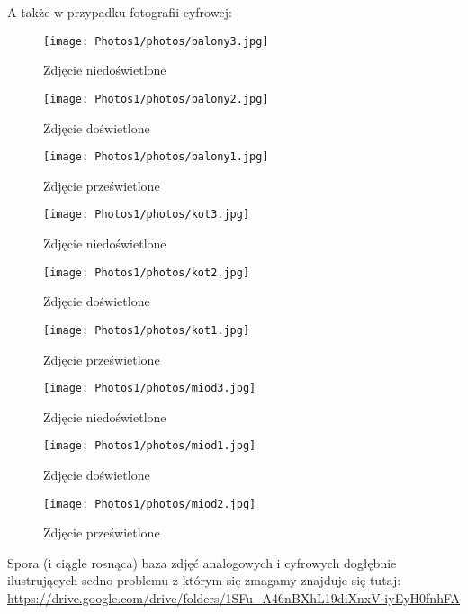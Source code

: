 \documentclass[]{mwart}
\begin{document}
\newpage
A także w przypadku fotografii cyfrowej:

\begin{figure}[H]
    \centering
    \texttt{[image: Photos1/photos/balony3.jpg]}
    \caption{Zdjęcie niedoświetlone}
\end{figure}
\begin{figure}[H]
    \centering
    \texttt{[image: Photos1/photos/balony2.jpg]}
    \caption{Zdjęcie doświetlone}
\end{figure}
\begin{figure}[H]
    \centering
    \texttt{[image: Photos1/photos/balony1.jpg]}
    \caption{Zdjęcie prześwietlone}
\end{figure}


\begin{figure}[H]
    \centering
    \texttt{[image: Photos1/photos/kot3.jpg]}
    \caption{Zdjęcie niedoświetlone}
\end{figure}
\begin{figure}[H]
    \centering
    \texttt{[image: Photos1/photos/kot2.jpg]}
    \caption{Zdjęcie doświetlone}
\end{figure}
\begin{figure}[H]
    \centering
    \texttt{[image: Photos1/photos/kot1.jpg]}
    \caption{Zdjęcie prześwietlone}
\end{figure}

\begin{figure}[H]
    \centering
    \texttt{[image: Photos1/photos/miod3.jpg]}
    \caption{Zdjęcie niedoświetlone}
\end{figure}
\begin{figure}[H]
    \centering
    \texttt{[image: Photos1/photos/miod1.jpg]}
    \caption{Zdjęcie doświetlone}
\end{figure}
\begin{figure}[H]
    \centering
    \texttt{[image: Photos1/photos/miod2.jpg]}
    \caption{Zdjęcie prześwietlone}
\end{figure}


Spora (i ciągle rosnąca) baza zdjęć analogowych i cyfrowych dogłębnie ilustrujących
sedno problemu z którym się zmagamy znajduje się tutaj:
\url{https://drive.google.com/drive/folders/1SFu_A46nBXhL19diXnxV-iyEyH0fnhFA}
\end{document}
